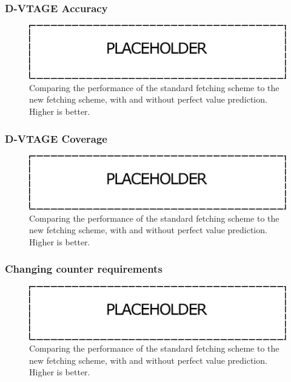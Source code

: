 \subsubsection{D-VTAGE Accuracy}
\begin{figure}[t]
    \centering
    \includegraphics[width=1\textwidth]{chapter3/graphics/wip.pdf}
    \caption{Comparing the performance of the standard fetching scheme to the new fetching scheme, with and without perfect value prediction. Higher is better.}
    \label{fig:vtag_accuracy}
	\vspace{1em}
\end{figure}

\subsubsection{D-VTAGE Coverage}
\begin{figure}[t]
    \centering
    \includegraphics[width=1\textwidth]{chapter3/graphics/wip.pdf}
    \caption{Comparing the performance of the standard fetching scheme to the new fetching scheme, with and without perfect value prediction. Higher is better.}
    \label{fig:vtag_accuracy}
	\vspace{1em}
\end{figure}


\subsubsection{Changing counter requirements}
\begin{figure}[t]
    \centering
    \includegraphics[width=1\textwidth]{chapter3/graphics/wip.pdf}
    \caption{Comparing the performance of the standard fetching scheme to the new fetching scheme, with and without perfect value prediction. Higher is better.}
    \label{fig:vtag_accuracy}
	\vspace{1em}
\end{figure}